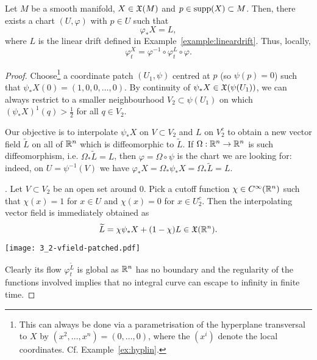 \begin{theorem}
  Let $M$ be a smooth manifold, $X\in\mathfrak{X}(M)$ and $p\in\operatorname{supp}(X)\subset M$.
  Then, there exists a chart $(U, \varphi)$ with $p\in U$ such that
  \begin{equation}
    \varphi_* X = L,
  \end{equation}
  where $L$ is the linear drift defined in Example~\ref{example:lineardrift}.
  Thus, locally,
  \begin{equation}
    \varphi_t^X = \varphi^{-1} \circ \varphi_t^L \circ \varphi.
  \end{equation}
\end{theorem}
\begin{proof}
  Choose\footnote{This can always be done via a parametrisation of the hyperplane transversal to $X$ by $(x^2, \ldots, x^{n}) = (0,\ldots,0)$, where the $(x^i)$ denote the local coordinates. Cf. Example~\ref{ex:hyplin}.} a coordinate patch $(U_1, \psi)$ centred at $p$ (so $\psi(p) = 0$) such that $\psi_* X(0) = (1,0,0,\ldots, 0)$.
  By continuity of $\psi_*X\in \mathfrak{X}(\psi(U_1))$, we can always restrict to a smaller neighbourhood $V_2\subset \psi(U_1)$ on which $(\psi_*X)^1(q) > \frac12$ for all $q\in V_2$.

  Our objective is to interpolate $\psi_* X$ on $V\subset V_2$ and $L$ on $V_2^c$ to obtain a new vector field $\widetilde{L}$ on all of $\mathbb{R}^n$ which is diffeomorphic to $\widetilde{L}$.
  If $\Omega:\mathbb{R}^n\to\mathbb{R}^n$ is such diffeomorphism, i.e. $\Omega_* \widetilde  L = L$, then $\varphi = \Omega\circ\psi$ is the chart we are looking for: indeed, on $U=\psi^{-1}(V)$ we have $\varphi_* X = \Omega_*\psi_*X = \Omega_* \widetilde{L} = L$.

  . Let $V\subset V_2$ be an open set around $0$. Pick a cutoff function $\chi\in C^\infty(\mathbb{R}^n)$ such that $\chi(x) = 1$ for $x\in U$ and $\chi(x) =0$ for $x\in U_2^c$.
  Then the interpolating vector field is immediately obtained as
  \begin{equation}
    \widetilde{L} = \chi \psi_*X + (1-\chi)L \in \mathfrak{X}(\mathbb{R}^n).
  \end{equation}
  \begin{marginfigure}
    \texttt{[image: 3\_2-vfield-patched.pdf]}
  \end{marginfigure}
  Clearly its flow $\varphi_t^{\widetilde{L}}$ is global as $\mathbb{R}^n$ has no boundary and the regularity of the functions involved implies that no integral curve can escape to infinity in finite time.


\end{proof}
